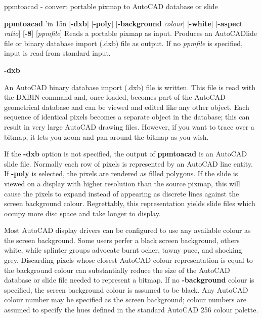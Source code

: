 ppmtoacad - convert portable pixmap to AutoCAD database or slide
\raggedright
{\bf ppmtoacad}
'in 15n
{\rm [}{\bf -dxb}{\rm ]}
{\rm [}{\bf -poly}{\rm ]}
{\rm [}{\bf -background}
{\it colour}{\rm ]}
{\rm [}{\bf -white}{\rm ]}
{\rm [}{\bf -aspect}
{\it ratio}{\rm ]}
{\rm [}{\bf -8}{\rm ]}
{\rm [}{\it ppmfile}{\rm ]}
\ind{-7.5em}
Reads a portable pixmap as input.  Produces an AutoCAD{l}ide file or
binary database import (.dxb) file as output.
If no
{\it ppmfile}
is specified, input is read from standard input.
\begin{TPlist}{{\bf -dxb}}
\item[{{\bf -dxb}}]
An AutoCAD binary database import (.dxb) file is written.  This file
is read with the DXBIN command and, once loaded, becomes part of
the AutoCAD geometrical database and can be viewed and edited like
any other object.  Each sequence of identical pixels becomes a
separate object in the database; this can result in very large AutoCAD
drawing files.  However, if you want to trace over a bitmap, it lets
you zoom and pan around the bitmap as you wish.
\item[{{\bf -poly}}]
If the
{\bf -dxb}
option is not specified, the output of
{\bf ppmtoacad}
is an AutoCAD slide file.  Normally each row of pixels is
represented by an AutoCAD line entity.  If
{\bf -poly}
is selected, the pixels are rendered as filled polygons.  If the
slide is viewed on a display with higher resolution than the source
pixmap, this will cause the pixels to expand instead of appearing as
discrete lines against the screen background colour.  Regrettably,
this representation yields slide files which occupy more disc space
and take longer to display.
\item[{{\bf -background}{\it \ colour}
}]
Most AutoCAD display drivers can be configured to use any available
colour as the screen background.  Some users perfer a black screen
background, others white, while splinter groups advocate burnt ocher,
tawny puce, and shocking grey.  Discarding pixels whose closest
AutoCAD colour representation is equal to the background colour can
substantially reduce the size of the AutoCAD database or slide file
needed to represent a bitmap.  If no
{\bf -background}
colour is specified, the screen background colour is assumed to be
black.  Any AutoCAD colour number may be specified as the screen
background; colour numbers are assumed to specify the hues defined
in the standard AutoCAD 256 colour palette.
\item[{{\bf -white}}]

\end{TPlist}
